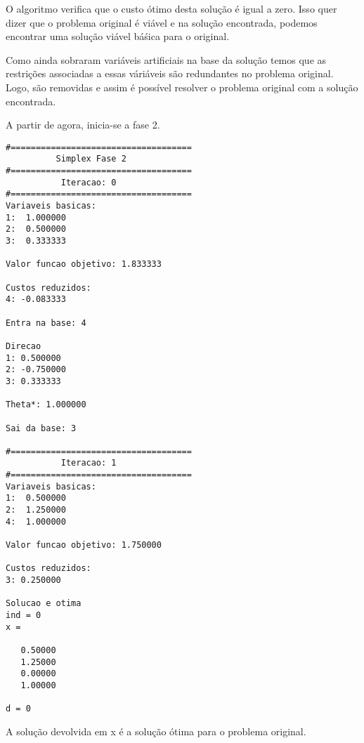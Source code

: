 \documentclass[
	12pt,				%
	openright,			%
	oneside,			%
	a4paper,			%
	english,			%
	french,				%
	spanish,			%
	brazil,				%
	]{abntex2}
\begin{document}
O algoritmo verifica que o custo ótimo desta solução é igual a zero. Isso quer dizer que o problema original é viável e na solução encontrada, podemos encontrar uma solução viável báśica para o original.

Como ainda sobraram variáveis artificiais na base da solução temos que as restrições associadas a essas váriáveis são redundantes no problema original. Logo, são removidas e assim é possível resolver o problema original com a solução encontrada.

A partir de agora, inicia-se a fase 2.


\begin{verbatim}
#====================================
          Simplex Fase 2
#====================================
           Iteracao: 0
#====================================
Variaveis basicas:
1:  1.000000
2:  0.500000
3:  0.333333

Valor funcao objetivo: 1.833333

Custos reduzidos:
4: -0.083333

Entra na base: 4

Direcao
1: 0.500000
2: -0.750000
3: 0.333333

Theta*: 1.000000

Sai da base: 3

#====================================
           Iteracao: 1
#====================================
Variaveis basicas:
1:  0.500000
2:  1.250000
4:  1.000000

Valor funcao objetivo: 1.750000

Custos reduzidos:
3: 0.250000

Solucao e otima 
ind = 0
x =

   0.50000
   1.25000
   0.00000
   1.00000

d = 0
\end{verbatim}
A solução devolvida em x é a solução ótima para o problema original.
%
%
%
\end{document}

